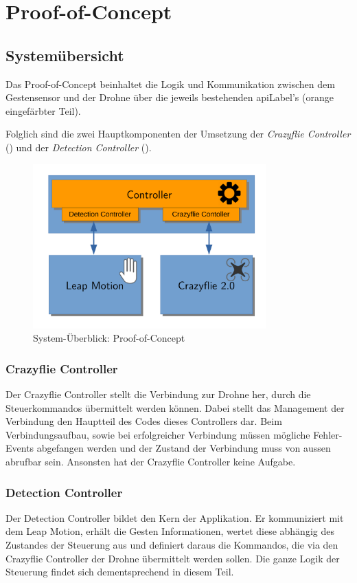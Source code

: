 \chapter{Proof-of-Concept}

\section{Systemübersicht}
Das Proof-of-Concept beinhaltet die Logik und Kommunikation zwischen dem Gestensensor und der Drohne über die jeweils bestehenden \gls{apiLabel}'s (orange eingefärbter Teil).

Folglich sind die zwei Hauptkomponenten der Umsetzung der \textit{Crazyflie Controller} () und der \textit{Detection Controller} ().

\begin{figure}[H]
	\centering
	\includegraphics[width=0.8\textwidth]{figures/system_poc.pdf}
	\caption{System-Überblick: Proof-of-Concept}
\end{figure}

\subsection{Crazyflie Controller}
\label{sec:poc:controllerCrazyflie}
Der Crazyflie Controller stellt die Verbindung zur Drohne her, durch die Steuerkommandos übermittelt werden können.
Dabei stellt das Management der Verbindung den Hauptteil des Codes dieses Controllers dar.
Beim Verbindungsaufbau, sowie bei erfolgreicher Verbindung müssen mögliche Fehler-Events abgefangen werden und der Zustand der Verbindung muss von aussen abrufbar sein.
Ansonsten hat der Crazyflie Controller keine Aufgabe.

\subsection{Detection Controller}
\label{sec:poc:controllerDetection}
Der Detection Controller bildet den Kern der Applikation. Er kommuniziert mit dem Leap Motion, erhält die Gesten Informationen, wertet diese abhängig des Zustandes der Steuerung aus und definiert daraus die Kommandos, die via den Crazyflie Controller der Drohne übermittelt werden sollen.
Die ganze Logik der Steuerung findet sich dementsprechend in diesem Teil.

